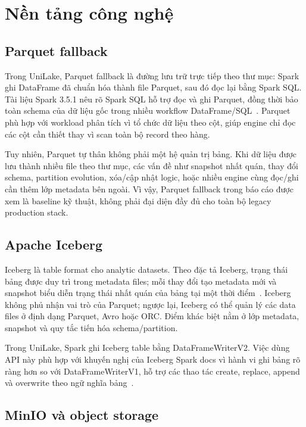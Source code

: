 \section{Nền tảng công nghệ}

\subsection{Parquet fallback}

Trong UniLake, Parquet fallback là đường lưu trữ trực tiếp theo thư mục: Spark ghi DataFrame đã chuẩn hóa thành file Parquet, sau đó đọc lại bằng Spark SQL. Tài liệu Spark 3.5.1 nêu rõ Spark SQL hỗ trợ đọc và ghi Parquet, đồng thời bảo toàn schema của dữ liệu gốc trong nhiều workflow DataFrame/SQL~\cite{sparkParquetDocs}. Parquet phù hợp với workload phân tích vì tổ chức dữ liệu theo cột, giúp engine chỉ đọc các cột cần thiết thay vì scan toàn bộ record theo hàng.

Tuy nhiên, Parquet tự thân không phải một hệ quản trị bảng. Khi dữ liệu được lưu thành nhiều file theo thư mục, các vấn đề như snapshot nhất quán, thay đổi schema, partition evolution, xóa/cập nhật logic, hoặc nhiều engine cùng đọc/ghi cần thêm lớp metadata bên ngoài. Vì vậy, Parquet fallback trong báo cáo được xem là baseline kỹ thuật, không phải đại diện đầy đủ cho toàn bộ legacy production stack.

\subsection{Apache Iceberg}

Iceberg là table format cho analytic datasets. Theo đặc tả Iceberg, trạng thái bảng được duy trì trong metadata files; mỗi thay đổi tạo metadata mới và snapshot biểu diễn trạng thái nhất quán của bảng tại một thời điểm~\cite{icebergSpec}. Iceberg không phủ nhận vai trò của Parquet; ngược lại, Iceberg có thể quản lý các data files ở định dạng Parquet, Avro hoặc ORC. Điểm khác biệt nằm ở lớp metadata, snapshot và quy tắc tiến hóa schema/partition.

Trong UniLake, Spark ghi Iceberg table bằng DataFrameWriterV2. Việc dùng API này phù hợp với khuyến nghị của Iceberg Spark docs vì hành vi ghi bảng rõ ràng hơn so với DataFrameWriterV1, hỗ trợ các thao tác create, replace, append và overwrite theo ngữ nghĩa bảng~\cite{icebergSparkWrites}.

\subsection{MinIO và object storage}

